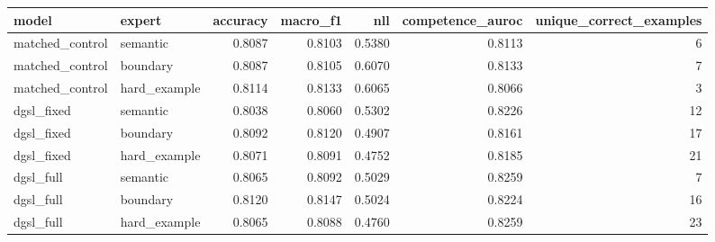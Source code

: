 \begin{tabular}{llrrrrr}
\toprule
model & expert & accuracy & macro\_f1 & nll & competence\_auroc & unique\_correct\_examples \\
\midrule
matched\_control & semantic & 0.8087 & 0.8103 & 0.5380 & 0.8113 & 6 \\
matched\_control & boundary & 0.8087 & 0.8105 & 0.6070 & 0.8133 & 7 \\
matched\_control & hard\_example & 0.8114 & 0.8133 & 0.6065 & 0.8066 & 3 \\
dgsl\_fixed & semantic & 0.8038 & 0.8060 & 0.5302 & 0.8226 & 12 \\
dgsl\_fixed & boundary & 0.8092 & 0.8120 & 0.4907 & 0.8161 & 17 \\
dgsl\_fixed & hard\_example & 0.8071 & 0.8091 & 0.4752 & 0.8185 & 21 \\
dgsl\_full & semantic & 0.8065 & 0.8092 & 0.5029 & 0.8259 & 7 \\
dgsl\_full & boundary & 0.8120 & 0.8147 & 0.5024 & 0.8224 & 16 \\
dgsl\_full & hard\_example & 0.8065 & 0.8088 & 0.4760 & 0.8259 & 23 \\
\bottomrule
\end{tabular}
